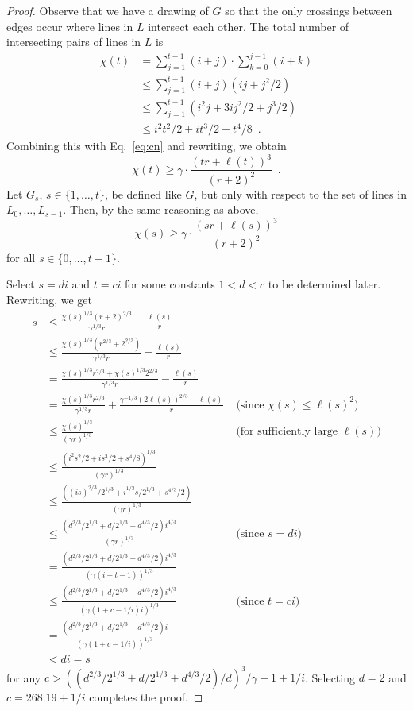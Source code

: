 \documentclass[12pt]{article}
\DeclareMathOperator{\cn}{cr}
\newcommand{\const}{268.19}
\begin{document}
\begin{proof}
Observe that we have a drawing of $G$ so that the only crossings between
edges occur where lines in $L$ intersect each other.  The total number of
intersecting pairs of lines in $L$ is 
\[
  \begin{aligned}
    \chi(t) 
      & = \sum_{j=1}^{t-1}(i+j)\cdot\sum_{k=0}^{j-1}(i+k) \\
      & \le \sum_{j=1}^{t-1}(i+j)(ij + j^2/2) \\
      & \le \sum_{j=1}^{t-1}(i^2j+3ij^2/2 + j^3/2) \\
      & \le i^2t^2/2 + it^3/2 + t^4/8 \enspace .
  \end{aligned}
\]
Combining this with Eq.~\ref{eq:cn} and rewriting, we obtain 
\[
  \chi(t)  \ge \gamma\cdot\frac{(tr+\ell(t))^3}{(r+2)^2} \enspace .
\]
Let $G_{s}$, $s\in\{1,\ldots,t\}$, be defined like $G$, but only with
respect to the set of lines in $L_0,\ldots,L_{s-1}$.  Then, by the same reasoning as above,
\[
  \chi(s) \ge \gamma\cdot\frac{(sr+\ell(s))^3}{(r+2)^2} 
\]
for all $s\in\{0,\ldots,t-1\}$.

Select $s=di$ and $t=ci$ for some constants $1 < d < c$ to be determined
later.
Rewriting, we get
\[
  \begin{aligned}
  s 
   &\le \frac{\chi(s)^{1/3} (r+2)^{2/3}}{\gamma^{1/3}r} 
       - \frac{\ell(s)}{r} \\ 
   &\le \frac{\chi(s)^{1/3} (r^{2/3}+2^{2/3})}{\gamma^{1/3}r} 
      - \frac{\ell(s)}{r} \\
   & = \frac{\chi(s)^{1/3}r^{2/3}+\chi(s)^{1/3}2^{2/3}}{\gamma^{1/3} r} 
          - \frac{\ell(s)}{r}  \\
   & = \frac{\chi(s)^{1/3}r^{2/3}}{\gamma^{1/3} r} 
           +\frac{\gamma^{-1/3}(2\ell(s))^{2/3} - \ell(s)}{r} 
    & \mbox{ (since $\chi(s) \le \ell(s)^2$)} \\
   &\le \frac{\chi(s)^{1/3}}{(\gamma r)^{1/3}}
    & \mbox{ (for sufficiently large $\ell(s)$)} \\
   &\le \frac{(i^2s^2/2 + is^3/2 + s^4/8)^{1/3}}{(\gamma r)^{1/3} }  \\
   &\le \frac{((is)^{2/3}/2^{1/3} + i^{1/3}s/2^{1/3} + s^{4/3}/2)}{(\gamma r)^{1/3}}  \\
   &\le \frac{(d^{2/3}/2^{1/3}+d/2^{1/3}+d^{4/3}/2)i^{4/3}}{(\gamma r)^{1/3}}  
    & \mbox{ (since $s=di$)} \\
   & =  \frac{(d^{2/3}/2^{1/3}+d/2^{1/3}+d^{4/3}/2)i^{4/3}}{(\gamma(i+t-1))^{1/3}} \\ 
   &\le  \frac{(d^{2/3}/2^{1/3}+d/2^{1/3}+d^{4/3}/2)i^{4/3}}{(\gamma(1+c-1/i)i)^{1/3}}  
    & \mbox{ (since $t=ci$)} \\
   & =  \frac{(d^{2/3}/2^{1/3}+d/2^{1/3}+d^{4/3}/2)i}{(\gamma(1+c-1/i))^{1/3}} \\ 
   & < di = s
  \end{aligned}
\]
for any $c > ((d^{2/3}/2^{1/3}+d/2^{1/3}+d^{4/3}/2)/d)^3/\gamma-1+1/i$.
Selecting $d=2$ and $c=\const+1/i$ completes the proof.
\end{proof}
\end{document}
